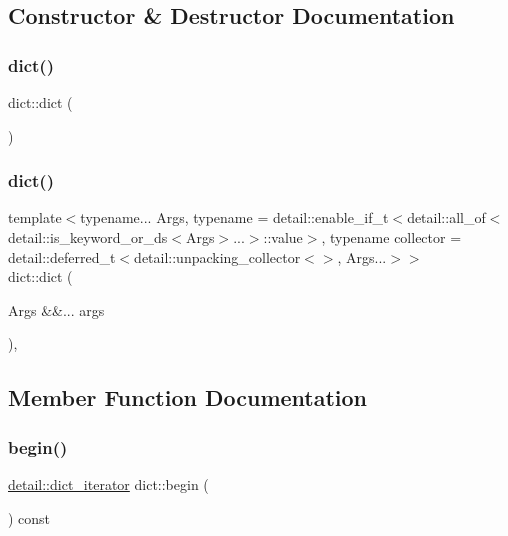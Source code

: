\subsection{Constructor \& Destructor Documentation}
\mbox{\label{classdict_af92208fa49f7ff889e84345935c57cc3}} 
\subsubsection{\texorpdfstring{dict()}{dict()}\hspace{0.1cm}{\footnotesize\ttfamily [1/2]}}
{\footnotesize\ttfamily dict\+::dict (\begin{DoxyParamCaption}{ }\end{DoxyParamCaption})\hspace{0.3cm}{\ttfamily [inline]}}

\mbox{\label{classdict_aa3fad12466e620bf39db98715843786a}} 
\subsubsection{\texorpdfstring{dict()}{dict()}\hspace{0.1cm}{\footnotesize\ttfamily [2/2]}}
{\footnotesize\ttfamily template$<$typename... Args, typename  = detail\+::enable\+\_\+if\+\_\+t$<$detail\+::all\+\_\+of$<$detail\+::is\+\_\+keyword\+\_\+or\+\_\+ds$<$\+Args$>$...$>$\+::value$>$, typename collector  = detail\+::deferred\+\_\+t$<$detail\+::unpacking\+\_\+collector$<$$>$, Args...$>$$>$ \\
dict\+::dict (\begin{DoxyParamCaption}\item[{Args \&\&...}]{args }\end{DoxyParamCaption})\hspace{0.3cm}{\ttfamily [inline]}, {\ttfamily [explicit]}}



\subsection{Member Function Documentation}
\mbox{\label{classdict_afed9b5478ca2a25cd3f6f156a416613c}} 
\subsubsection{\texorpdfstring{begin()}{begin()}}
{\footnotesize\ttfamily \mbox{\hyperlink{pytypes_8h_a3c02b3eee4eaa3b690bcdb0405242079}{detail\+::dict\+\_\+iterator}} dict\+::begin (\begin{DoxyParamCaption}{ }\end{DoxyParamCaption}) const\hspace{0.3cm}{\ttfamily [inline]}}

